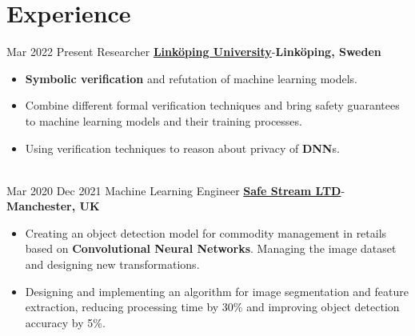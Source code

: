 \documentclass[letterpaper]{DS_class_file} %
\begin{document}
\makeprofile %




\section{Experience}

\begin{twenty}
    \twentyitem
		{Mar 2022}
		{Present}
		{\hspace{0.3cm}Researcher}
		{\href{https://liu.se/}{\textbf{Linköping University}}-\textbf{Linköping, Sweden}}
		{}
		{\begin{itemize}
                \item \textbf{Symbolic verification} and refutation of machine learning models.
                \item Combine different formal verification techniques and bring safety guarantees to machine learning models and their
training processes.
\item  Using verification techniques to reason about privacy of \textbf{DNN}s.
			
                
		\end{itemize}}
		\\
    \twentyitem
		{Mar 2020}
		{Dec 2021}
		{\hspace{0.3cm}Machine Learning Engineer}
		{\href{https://www.linkedin.com/company/safe-stream/about/}{\textbf{Safe Stream LTD}}-\textbf{Manchester, UK}}
		{}
		{\begin{itemize}
                \item Creating an object detection model for commodity management in retails based on  \textbf{Convolutional Neural Networks}. Managing the image dataset and designing 
                    new transformations.
                \item Designing and implementing an algorithm for image segmentation and feature extraction, reducing processing time by 30\% and improving object detection accuracy by 5\%.
                
			
                

\end{itemize}}
\end{twenty}
\end{document}
